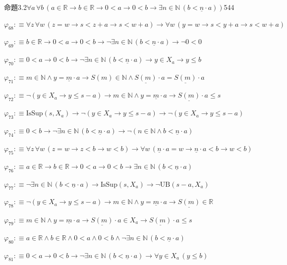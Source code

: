 \begin{fullproof}{命題3.2}{$\forall a\,\forall b\,(a \in \mathbb{R} \to b \in \mathbb{R} \to 0 < a \to 0 < b \to \exists n \in \mathbb{N}\,(b < \underline{n} \cdot a))$}{544}
\begin{abbrevlist}
\item $\varphi_{68} :\equiv \forall z\,\forall w\,(z = w \to s < z + a \to s < w + a) \to \forall w\,(y = w \to s < y + a \to s < w + a)$
\item $\varphi_{69} :\equiv b \in \mathbb{R} \to 0 < a \to 0 < b \to \neg \exists n \in \mathbb{N}\,(b < \underline{n} \cdot a) \to \neg 0 < 0$
\item $\varphi_{70} :\equiv 0 < a \to 0 < b \to \neg \exists n \in \mathbb{N}\,(b < \underline{n} \cdot a) \to y \in X_{a} \to y \leq b$
\item $\varphi_{71} :\equiv m \in \mathbb{N} \land y = \underline{m} \cdot a \to S(m) \in \mathbb{N} \land \underline{S(m)} \cdot a = \underline{S(m)} \cdot a$
\item $\varphi_{72} :\equiv \neg (y \in X_{a} \to y \leq s - a) \to m \in \mathbb{N} \land y = \underline{m} \cdot a \to \underline{S(m)} \cdot a \leq s$
\item $\varphi_{73} :\equiv \mathrm{IsSup}(s,X_{a}) \to \neg (y \in X_{a} \to y \leq s - a) \to \neg (y \in X_{a} \to y \leq s - a)$
\item $\varphi_{74} :\equiv 0 < b \to \neg \exists n \in \mathbb{N}\,(b < \underline{n} \cdot a) \to \neg (n \in \mathbb{N} \land b < \underline{n} \cdot a)$
\item $\varphi_{75} :\equiv \forall z\,\forall w\,(z = w \to z < b \to w < b) \to \forall w\,(\underline{n} \cdot a = w \to \underline{n} \cdot a < b \to w < b)$
\item $\varphi_{76} :\equiv a \in \mathbb{R} \to b \in \mathbb{R} \to 0 < a \to 0 < b \to \exists n \in \mathbb{N}\,(b < \underline{n} \cdot a)$
\item $\varphi_{77} :\equiv \neg \exists n \in \mathbb{N}\,(b < \underline{n} \cdot a) \to \mathrm{IsSup}(s,X_{a}) \to \neg \mathrm{UB}(s - a,X_{a})$
\item $\varphi_{78} :\equiv \neg (y \in X_{a} \to y \leq s - a) \to m \in \mathbb{N} \land y = \underline{m} \cdot a \to \underline{S(m)} \in \mathbb{R}$
\item $\varphi_{79} :\equiv m \in \mathbb{N} \land y = \underline{m} \cdot a \to \underline{S(m)} \cdot a \in X_{a} \to \underline{S(m)} \cdot a \leq s$
\item $\varphi_{80} :\equiv a \in \mathbb{R} \land b \in \mathbb{R} \land 0 < a \land 0 < b \land \neg \exists n \in \mathbb{N}\,(b < \underline{n} \cdot a)$
\item $\varphi_{81} :\equiv 0 < a \to 0 < b \to \neg \exists n \in \mathbb{N}\,(b < \underline{n} \cdot a) \to \forall y \in X_{a}\,(y \leq b)$

\end{abbrevlist}
\end{fullproof}
